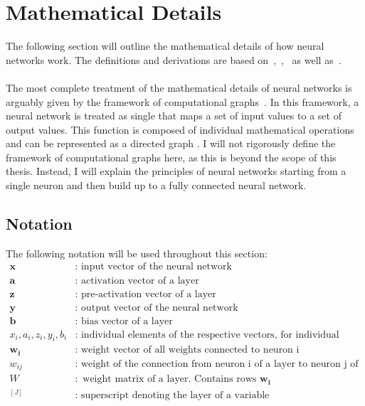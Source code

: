 \section{Mathematical Details}
\label{sec:nn-mathematical-details}
The following section will outline the mathematical details of how neural networks work.
The definitions and derivations are based on~\cite[chapter 1.2-1.3]{aggarwal_neural_2018},~\cite[chapter 5-6]{goodfellow_deep_2016},~\cite{ibm_nn} as well as~\cite[chapter 4.4]{haykin_neural_1998}.
\\
\\
The most complete treatment of the mathematical details of neural networks is arguably given by the framework of computational graphs~\cite{bettilyon_computationalgraphs_2020}.
In this framework, a neural network is treated as single that maps a set of input values to a set of output values.
This function is composed of individual mathematical operations and can be represented as a directed graph \cite[section 1.4]{haykin_neural_1998}.
I will not rigorously define the framework of computational graphs here, as this is beyond the scope of this thesis.
Instead, I will explain the principles of neural networks starting from a single neuron and then build up to a fully connected neural network. 
\subsection{Notation}
\label{subsec:nn-notation}
The following notation will be used throughout this section:
\begin{equation*}
    \begin{array}{ll}
    \bm{x} & : \text { input vector of the neural network} \\
    \bm{a} & : \text { activation vector of a layer} \\
    \bm{z} & : \text { pre-activation vector of a layer} \\
    \bm{y} & : \text { output vector of the neural network} \\
    \bm{b} & : \text { bias vector of a layer} \\
    x_i, a_i, z_i, y_i, b_i & : \text { individual elements of the respective vectors, for individual nodes } \\
    \bm{w_i} & : \text { weight vector of all weights connected to neuron i} \\
    w_{ij} & : \text { weight of the connection from neuron i of a layer to neuron j of the previous layer } \\
    W & : \text { weight matrix of a layer. Contains rows $\bm{w_i}$} \\
    ^{[J]} & : \text { superscript denoting the layer of a variable} \\
    \end{array}
\end{equation*}
